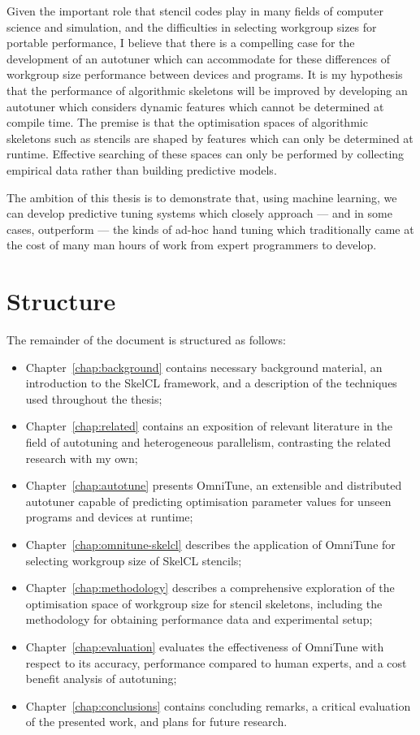 Given the important role that stencil codes play in many fields of
computer science and simulation, and the difficulties in selecting
workgroup sizes for portable performance, I believe that there is a
compelling case for the development of an autotuner which can
accommodate for these differences of workgroup size performance
between devices and programs. It is my hypothesis that the performance
of algorithmic skeletons will be improved by developing an autotuner
which considers dynamic features which cannot be determined at compile
time. The premise is that the optimisation spaces of algorithmic
skeletons such as stencils are shaped by features which can only be
determined at runtime. Effective searching of these spaces can only be
performed by collecting empirical data rather than building predictive
models.

The ambition of this thesis is to demonstrate that, using machine
learning, we can develop predictive tuning systems which closely
approach --- and in some cases, outperform --- the kinds of ad-hoc
hand tuning which traditionally came at the cost of many man hours of
work from expert programmers to develop.


\section{Structure}

The remainder of the document is structured as follows:
%
\begin{itemize}
\item Chapter~\ref{chap:background} contains necessary background
  material, an introduction to the SkelCL framework, and a description
  of the techniques used throughout the thesis;
\item Chapter~\ref{chap:related} contains an exposition of relevant
  literature in the field of autotuning and heterogeneous parallelism,
  contrasting the related research with my own;
\item Chapter~\ref{chap:autotune} presents OmniTune, an extensible and
  distributed autotuner capable of predicting optimisation parameter
  values for unseen programs and devices at runtime;
\item Chapter~\ref{chap:omnitune-skelcl} describes the application of
  OmniTune for selecting workgroup size of SkelCL stencils;
\item Chapter~\ref{chap:methodology} describes a comprehensive
  exploration of the optimisation space of workgroup size for stencil
  skeletons, including the methodology for obtaining performance data
  and experimental setup;
\item Chapter~\ref{chap:evaluation} evaluates the effectiveness of
  OmniTune with respect to its accuracy, performance compared to human
  experts, and a cost benefit analysis of autotuning;
\item Chapter~\ref{chap:conclusions} contains concluding remarks, a
  critical evaluation of the presented work, and plans for future
  research.
\end{itemize}


